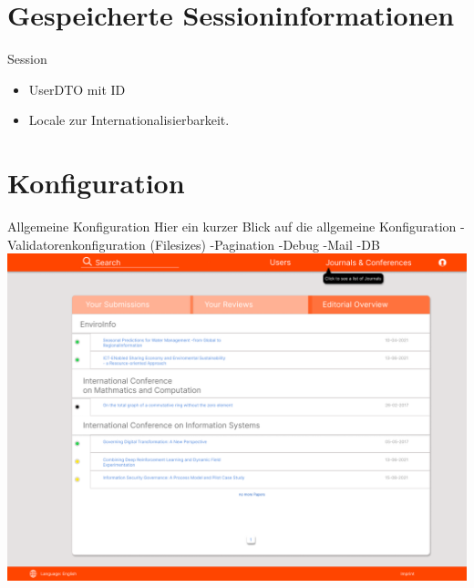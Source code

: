 \documentclass{beamer}
\begin{document}
    \section{Gespeicherte Sessioninformationen}
    \begin{frame}{Session}
        \begin{itemize}
            \item User\-DTO mit ID
            \pause
            \item Locale zur Internationalisierbarkeit.
        \end{itemize}
    \end{frame}


    \section{Konfiguration}
    \begin{frame}{Allgemeine Konfiguration}
        Hier ein kurzer Blick auf die allgemeine Konfiguration
        -Validatorenkonfiguration (Filesizes)
        -Pagination
        -Debug
        -Mail
        -DB
        \centering
        \includegraphics[height=0.75\textheight]{../../docs/Pflichtenheft/graphics/Homepage-png}
    \end{frame}
\end{document}
